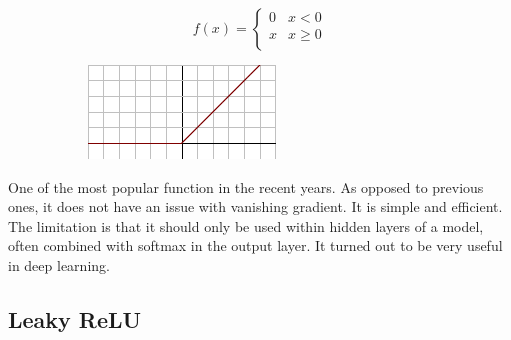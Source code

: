 \begin{figure}[H]
\raggedright
\begin{subfigure}{.35\textwidth}
  \centering
   \[
f(x) = \begin{cases}
       0 & x < 0 \\
       x & x \geq 0 \\
     \end{cases} \]  
\end{subfigure}%
\begin{subfigure}{.25\textwidth}
  \centering
  \includegraphics[width=\textwidth]{tex/images/activation/relu}
\end{subfigure}
\end{figure}

\noindent
One of the most popular function in the recent years. As opposed to previous ones, it does not have an issue with vanishing gradient. It is simple and efficient. The limitation is that it should only be used within hidden layers of a model, often combined with softmax in the output layer. It turned out to be very useful in deep learning.

\subsection*{Leaky ReLU}

